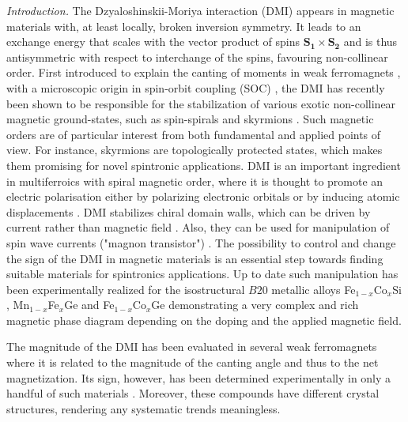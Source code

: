 \documentclass[aps,prl,showpacs,reprint,floatfix]{revtex4-1}
\begin{document}
\pacs{}

\maketitle


{\it Introduction.} 
The Dzyaloshinskii-Moriya interaction (DMI) appears in magnetic materials with, at least locally, broken inversion symmetry. 
It leads to an exchange energy that scales with the vector product of spins
$\bm {S_1} \times \bm {S_2}$ 
and is thus antisymmetric with respect to interchange of the spins, favouring non-collinear order. 
First introduced to explain the canting of moments in weak ferromagnets \cite{Dzyaloshinsky}, with a microscopic origin in spin-orbit coupling (SOC) \cite{Moriya1,Moriya2}, the DMI has recently been shown
to be responsible for the stabilization of various exotic non-collinear magnetic ground-states, such as spin-spirals \cite{bode} and skyrmions \cite{skyrm1,skyrm2,skyrm3}. 
Such magnetic orders are of particular interest from both fundamental and applied points of view.
For instance, skyrmions are topologically protected states, which makes them promising for novel spintronic applications. 
DMI is an important ingredient in multiferroics with spiral magnetic order, where it is thought to promote an electric polarisation either by polarizing electronic orbitals \cite{Katsura} or by inducing atomic displacements \cite{Sergienko}.
DMI stabilizes chiral domain walls, which can be driven by current rather than magnetic field \cite{emori, PhysRevLett.116.147204}.
Also, they can be used for manipulation of spin wave currents ("magnon transistor") \cite{PhysRevLett.116.147204}.
The possibility to control and change the sign of the DMI in magnetic materials is an essential step towards finding suitable materials for spintronics applications.
Up to date such manipulation has been experimentally realized for the isostructural $B20$ metallic alloys  Fe$_{1-x}$Co$_{x}$Si \cite{FeCoSi},  
Mn$_{1-x}$Fe$_{x}$Ge \cite{MnFeGe} and  Fe$_{1-x}$Co$_{x}$Ge \cite{FeCoGe} demonstrating a very complex and rich magnetic phase diagram depending on the doping and the applied magnetic field.

The magnitude of the DMI has been evaluated in several weak ferromagnets where it is related to the magnitude of the canting angle and thus to the net magnetization.
Its sign, however, has been determined experimentally in only a handful of such materials \cite{MoriyaNiF2,Shulman,BrownNiF2,MoskvinFeF3, BrownGd2CuO4, DmitrienkoNP, Fe2O3, YVO4}. 
Moreover, these compounds have different crystal structures, rendering any systematic trends meaningless. 
\end{document}
